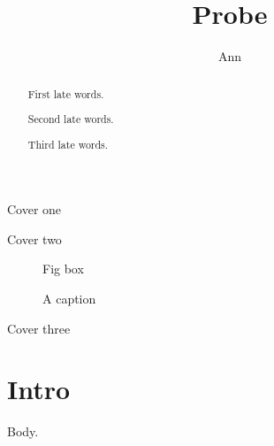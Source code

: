 \documentclass{article}
\begin{document}
\title{Probe}\author{Ann}
\maketitle
\begin{center}Cover one\end{center}
\begin{abstract}First late words.\end{abstract}
\begin{center}Cover two\end{center}
\begin{abstract}Second late words.\end{abstract}
\begin{figure}[h]\centering Fig box\caption{A caption}\end{figure}
\begin{center}Cover three\end{center}
\begin{abstract}Third late words.\end{abstract}
\section{Intro}
Body.
\end{document}
